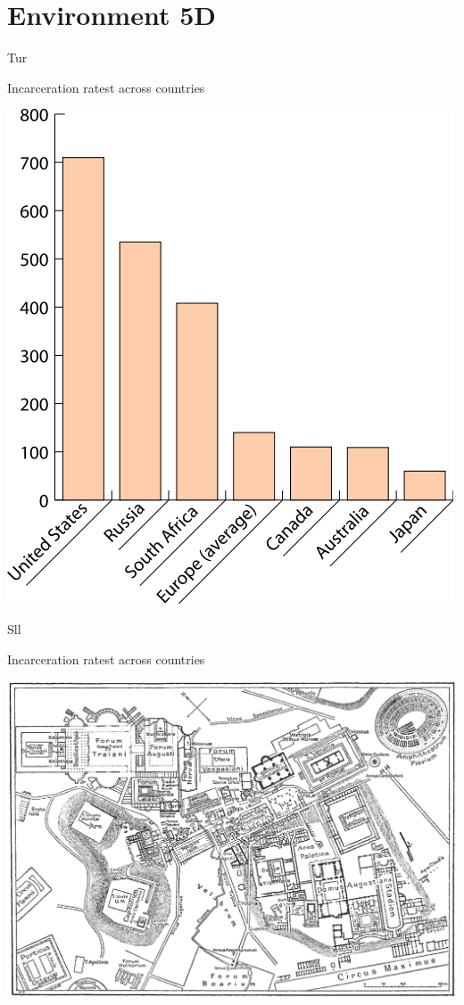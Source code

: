 
\section{Environment 5D}

\lipsum[1-2]

\begin{map}{T}{ur}
\caption{Incarceration ratest across countries}
\label{chart:incarceration}
\includegraphics[width=\chartwidth,height=\chartheight]{incarceration}  
\end{map}

\begin{map}{S}{ll}
\caption{Incarceration ratest across countries}
\label{chart:incarceration}
\includegraphics[width=\chartwidth,height=\chartheight]{Rome}  
\end{map}

